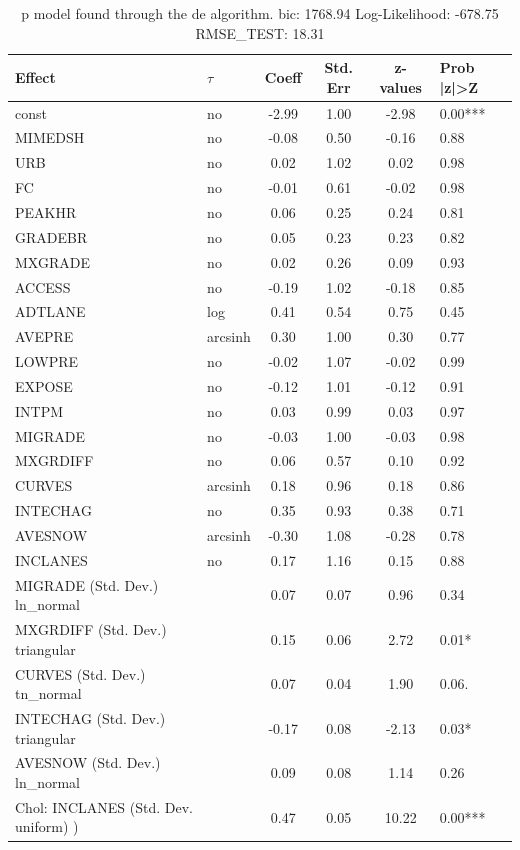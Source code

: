 \begin{table}
	\caption{p model found through the de algorithm. bic: 1768.94 Log-Likelihood: -678.75 RMSE_TEST: 18.31}
	\begin{center}
		\begin{tabular}{|l|l|c|c|c|l|}
			\hline
			Effect & $\tau$ & Coeff & Std. Err & z-values & Prob |z|>Z \\
			\hline
			const & no & -2.99 & 1.00 & -2.98 & 0.00*** \\
			\hline
			MIMEDSH & no & -0.08 & 0.50 & -0.16 & 0.88 \\
			\hline
			URB & no & 0.02 & 1.02 & 0.02 & 0.98 \\
			\hline
			FC & no & -0.01 & 0.61 & -0.02 & 0.98 \\
			\hline
			PEAKHR & no & 0.06 & 0.25 & 0.24 & 0.81 \\
			\hline
			GRADEBR & no & 0.05 & 0.23 & 0.23 & 0.82 \\
			\hline
			MXGRADE & no & 0.02 & 0.26 & 0.09 & 0.93 \\
			\hline
			ACCESS & no & -0.19 & 1.02 & -0.18 & 0.85 \\
			\hline
			ADTLANE & log & 0.41 & 0.54 & 0.75 & 0.45 \\
			\hline
			AVEPRE & arcsinh & 0.30 & 1.00 & 0.30 & 0.77 \\
			\hline
			LOWPRE & no & -0.02 & 1.07 & -0.02 & 0.99 \\
			\hline
			EXPOSE & no & -0.12 & 1.01 & -0.12 & 0.91 \\
			\hline
			INTPM & no & 0.03 & 0.99 & 0.03 & 0.97 \\
			\hline
			MIGRADE & no & -0.03 & 1.00 & -0.03 & 0.98 \\
			\hline
			MXGRDIFF & no & 0.06 & 0.57 & 0.10 & 0.92 \\
			\hline
			CURVES & arcsinh & 0.18 & 0.96 & 0.18 & 0.86 \\
			\hline
			INTECHAG & no & 0.35 & 0.93 & 0.38 & 0.71 \\
			\hline
			AVESNOW & arcsinh & -0.30 & 1.08 & -0.28 & 0.78 \\
			\hline
			INCLANES & no & 0.17 & 1.16 & 0.15 & 0.88 \\
			\hline
			MIGRADE (Std. Dev.) ln_normal &  & 0.07 & 0.07 & 0.96 & 0.34 \\
			\hline
			MXGRDIFF (Std. Dev.) triangular &  & 0.15 & 0.06 & 2.72 & 0.01* \\
			\hline
			CURVES (Std. Dev.) tn_normal &  & 0.07 & 0.04 & 1.90 & 0.06. \\
			\hline
			INTECHAG (Std. Dev.) triangular &  & -0.17 & 0.08 & -2.13 & 0.03* \\
			\hline
			AVESNOW (Std. Dev.) ln_normal &  & 0.09 & 0.08 & 1.14 & 0.26 \\
			\hline
			 Chol: INCLANES (Std. Dev. uniform) ) &  & 0.47 & 0.05 & 10.22 & 0.00*** \\
			\hline
		\end{tabular}
	\end{center}
\end{table}